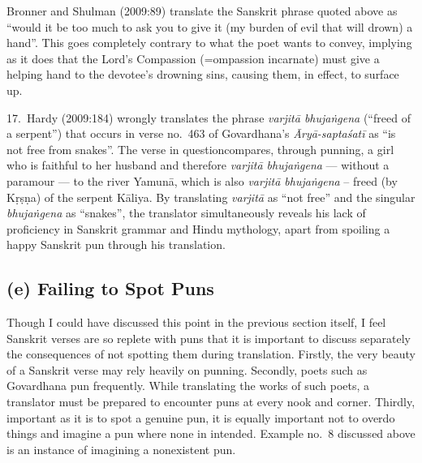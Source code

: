 Bronner and Shulman (2009:89) translate the Sanskrit phrase quoted above as “would it be too much to ask you to give it (my burden of evil that will drown) a hand”. This goes completely contrary to what the poet wants to convey, implying as it does that the Lord’s Compassion (=ompassion incarnate) must give a helping hand to the devotee’s drowning sins, causing them, in effect, to surface up. 

17.~Hardy (2009:184) wrongly translates the phrase \textsl{varjitā bhujaṅgena} (“freed of a serpent”) that occurs in verse no.\ 463 of Govardhana’s \textsl{Āryā-saptaśatī} as “is not free from snakes”. The verse in question\break compares, through punning, a girl who is faithful to her husband and therefore \textsl{varjitā bhujaṅgena} --- without a paramour --- to the river Yamunā, which is also \textsl{varjitā bhujaṅgena } --  freed (by Kṛṣṇa) of the serpent Kāliya. By translating \textsl{varjitā} as “not free” and the singular \textsl{bhujaṅgena} as “snakes”, the translator simultaneously reveals his lack of proficiency in Sanskrit grammar and Hindu mythology, apart from spoiling a happy Sanskrit pun through his translation.\\[-21pt]

\subsection*{(e) Failing to Spot Puns}

Though I could have discussed this point in the previous section itself, I feel Sanskrit verses are so replete with puns that it is important to discuss separately the consequences of not spotting them during translation. Firstly, the very beauty of a Sanskrit verse may rely heavily on punning. Secondly, poets such as Govardhana pun frequently. While translating the works of such poets, a translator must be prepared to encounter puns at every nook and corner. Thirdly, important as it is to spot a genuine pun, it is equally important not to overdo things and imagine a pun where none in intended. Example no.\ 8 discussed above is an instance of imagining a nonexistent pun. 

